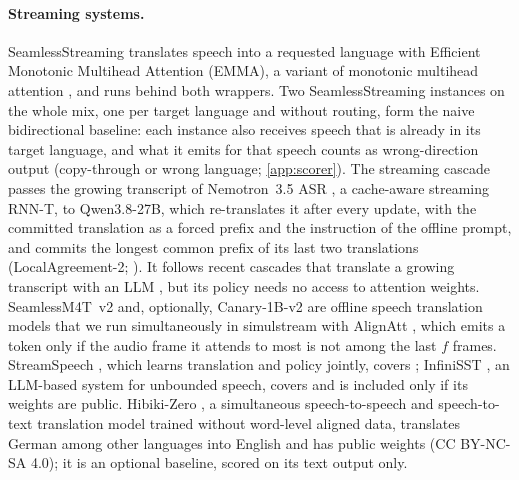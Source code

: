 \paragraph{Streaming systems.}
SeamlessStreaming \citep{seamless2023seamless} translates speech into a requested language with Efficient Monotonic Multihead Attention (EMMA), a variant of monotonic multihead attention \citep{ma2020monotonic}, and runs behind both wrappers. Two SeamlessStreaming instances on the whole mix, one per target language and without routing, form the naive bidirectional baseline: each instance also receives speech that is already in its target language, and what it emits for that speech counts as wrong-direction output (copy-through or wrong language; \cref{app:scorer}). The streaming cascade passes the growing transcript of Nemotron~3.5 ASR \citep{nvidia2026nemotron35asr}, a cache-aware streaming RNN-T, to Qwen3.8-27B, which re-translates it after every update, with the committed translation as a forced prefix and the instruction of the offline prompt, and commits the longest common prefix of its last two translations (LocalAgreement-2; \citealp{liu2020lowlatency,polak2022cuni,machacek2023turning}). It follows recent cascades that translate a growing transcript with an LLM \citep{fuxa2026alignatt4llm}, but its policy needs no access to attention weights. SeamlessM4T~v2 \citep{seamless2023seamless,seamless2025joint} and, optionally, Canary-1B-v2 \citep{sekoyan2025canary} are offline speech translation models that we run simultaneously in simulstream \citep{gaido2025simulstream} with AlignAtt \citep{papi2023alignatt}, which emits a token only if the audio frame it attends to most is not among the last $f$ frames. StreamSpeech \citep{zhang2024streamspeech}, which learns translation and policy jointly, covers \deen; InfiniSST \citep{ouyang2025infinisst}, an LLM-based system for unbounded speech, covers \ende and is included only if its weights are public. Hibiki-Zero \citep{labiausse2026simultaneous}, a simultaneous speech-to-speech and speech-to-text translation model trained without word-level aligned data, translates German among other languages into English and has public weights (CC BY-NC-SA 4.0); it is an optional \deen baseline, scored on its text output only.

